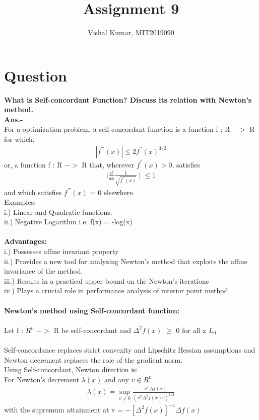 \documentclass[fleqn]{article}
\title{Assignment 9}
\author{Vishal Kumar, MIT2019090}
\date{}
\begin{document}
\maketitle
\section*{Question}
{\bf What is Self-concordant Function? Discuss its relation with Newton’s method.}
\\
{\bf Ans.-}
\\

For a optimization problem, a self-concordant function is a function f : R $->$ R for which,
\begin{align*}
|f^{'''}(x)| \le 2f^{''}(x)^{3/2}
\end{align*}
or, a function f : R $->$ R that, wherever $f^{''}(x) > 0$, satisfies
\begin{align*}
\mid{\frac{d}{dx}\frac{1}{\sqrt{f^{''}(x)}}}\mid{} \le 1
\end{align*}
and which satisfies $f^{'''}(x)$ = 0 elsewhere.
\\
Examples:
\\
i.) Linear and Quadratic functions.
\\
ii.) Negative Logarithm i.e. f(x) = -log(x)
\\
\\
{\bf Advantages:}
\\
i.) Possesses affine invariant property
\\
ii.) Provides a new tool for analyzing Newton’s method that exploits the affine invariance of the method.
\\
iii.) Results in a practical upper bound on the Newton’s iterations
\\
iv.) Plays a crucial role in performance analysis of interior point method
\\
\\
{\bf Newton's method using Self-concordant function:}
\\
\\
Let f : $R^{n}$ $->$ R be self-concordant and $\Delta^{2}f(x)$ $\ge$ 0 for all x $L_{0}$
\\
\\
Self-concordance replaces strict convexity and Lipschitz Hessian assumptions and Newton decrement replaces the role of the gradient norm.
\\
Using Self-concordant, Newton direction is:
\\

For Newton’s decrement $\lambda(x)$ and any $v \in R^{n}$
\begin{align*}
\lambda(x) = \sup_{v \neq 0}\frac{-v^T\Delta f(x)}{(v^T\Delta^2f(x)v)^{1/2}}
\end{align*}
with the supremum attainment at v = $- [\Delta^2 f(x)]^{-1} \Delta f(x)$
\end{document}
